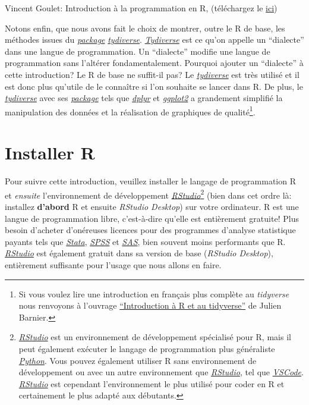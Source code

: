 \documentclass[
]{book}
\begin{document}
Vincent Goulet: Introduction à la programmation en R, (téléchargez le \href{https://cran.r-project.org/doc/contrib/Goulet_introduction_programmation_R.pdf}{ici})

Notons enfin, que nous avons fait le choix de montrer, outre le R de base, les méthodes issues du \protect\hyperlink{packages}{\emph{package}} \href{https://www.tidyverse.org/}{\emph{tydiverse}}. \href{https://www.tidyverse.org/}{\emph{Tydiverse}} est ce qu'on appelle un ``dialecte'' dans une langue de programmation. Un ``dialecte'' modifie une langue de programmation sans l'altérer fondamentalement. Pourquoi ajouter un ``dialecte'' à cette introduction? Le R de base ne suffit-il pas? Le \href{https://www.tidyverse.org/}{\emph{tydiverse}} est très utilisé et il est donc plus qu'utile de le connaître si l'on souhaite se lancer dans R. De plus, le \href{https://www.tidyverse.org/}{\emph{tydiverse}} avec ses \protect\hyperlink{packages}{\emph{package}} tels que \href{https://dplyr.tidyverse.org/}{\emph{dplyr}} et \href{https://ggplot2.tidyverse.org/}{\emph{ggplot2}} a grandement simplifié la manipulation des données et la réalisation de graphiques de qualité\footnote{Si vous voulez lire une introduction en français plus complète au \emph{tidyverse} nous renvoyons à l'ouvrage \href{https://juba.github.io/tidyverse/}{``Introduction à R et au tidyverse''} de Julien Barnier.}.

\hypertarget{installer-r}{%
\section{Installer R}\label{installer-r}}

Pour suivre cette introduction, veuillez installer le langage de programmation R et \emph{ensuite} l'environnement de développement \href{https://posit.co/}{\emph{RStudio}}\footnote{\href{https://posit.co/}{\emph{RStudio}} est un environnement de développement spécialisé pour R, mais il peut également exécuter le langage de programmation plus généraliste \href{https://www.python.org/}{\emph{Python}}. Vous pouvez également utiliser R sans environnement de développement ou avec un autre environnement que \href{https://posit.co/}{\emph{RStudio}}, tel que \href{https://code.visualstudio.com/}{\emph{VSCode}}. \href{https://posit.co/}{\emph{RStudio}} est cependant l'environnement le plus utilisé pour coder en R et certainement le plus adapté aux débutants.} (bien dans cet ordre là: installez \textbf{d'abord} R et ensuite \emph{RStudio Desktop}) sur votre ordinateur. R est une langue de programmation libre, c'est-à-dire qu'elle est entièrement gratuite! Plus besoin d'acheter d'onéreuses licences pour des programmes d'analyse statistique payants tels que \href{https://www.stata.com/}{\emph{Stata}}, \href{https://www.ibm.com/fr-fr/products/spss-statistics}{\emph{SPSS}} et \href{https://www.sas.com/}{\emph{SAS}}, bien souvent moins performants que R. \href{https://posit.co/}{\emph{RStudio}} est également gratuit dans sa version de base (\emph{RStudio Desktop}), entièrement suffisante pour l'usage que nous allons en faire.
\end{document}

